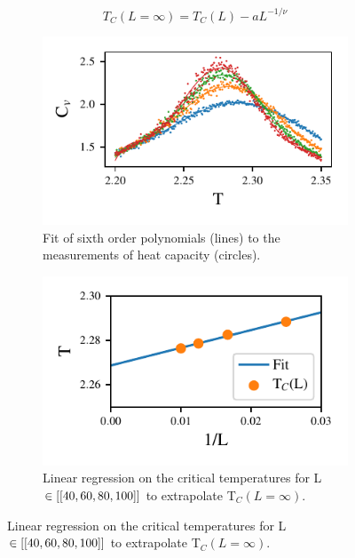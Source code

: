  \begin{equation}
   \label{eq:scaling}
   T_C(L=\infty) = T_C(L) - aL^{-1/\nu}
 \end{equation}


 \begin{figure}[ht]
   \begin{subfigure}[t]{.5\textwidth} %
     \centering
     \includegraphics[width=\linewidth]{../figures/fit.pdf}
     \caption{Fit of sixth order polynomials (lines) to the measurements
     of heat capacity (circles).}
     \label{fig:polyfit}
   \end{subfigure}
   \hfill
   \begin{subfigure}[t]{.5\textwidth}
     \centering
     \includegraphics[width=\linewidth]{../figures/Tc_fit.pdf}
     \caption{Linear regression on the critical temperatures for L $\in \left[[40,60,80,100]\right]$
     to extrapolate T$_C(L=\infty)$.}
     \label{fig:lin_reg}
   \end{subfigure}
   \label{fig:test}
 \end{figure}


